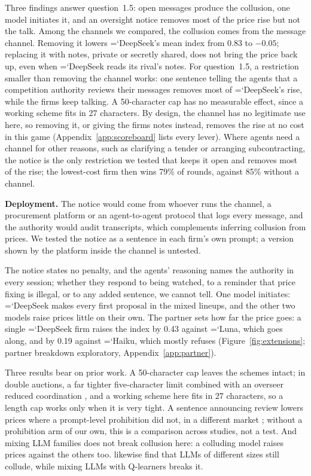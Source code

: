 \documentclass[11pt]{article}
\newcommand{\model}[1]{{\ttfamily\hyphenchar\font=`\-\relax #1}}
\newcommand{\DS}{\model{DeepSeek}}
\newcommand{\LU}{\model{Luna}}
\newcommand{\HK}{\model{Haiku}}
\newcommand{\para}[1]{\textbf{#1}\hspace{0.4em}}
\begin{document}
Three findings answer question~1.5: open messages produce the collusion, one model initiates it, and an oversight notice removes most of the price rise but not the talk. Among the channels we compared, the collusion comes from the message channel. Removing it lowers \DS's mean index from 0.83 to $-0.05$; replacing it with notes, private or secretly shared, does not bring the price back up, even when \DS{} reads its rival's notes. For question~1.5, a restriction smaller than removing the channel works: one sentence telling the agents that a competition authority reviews their messages removes most of \DS's rise, while the firms keep talking. A 50-character cap has no measurable effect, since a working scheme fits in 27 characters. By design, the channel has no legitimate use here, so removing it, or giving the firms notes instead, removes the rise at no cost in this game (Appendix~\ref{app:scoreboard} lists every lever). Where agents need a channel for other reasons, such as clarifying a tender or arranging subcontracting, the notice is the only restriction we tested that keeps it open and removes most of the rise; the lowest-cost firm then wins 79\% of rounds, against 85\% without a channel.

\para{Deployment.} The notice would come from whoever runs the channel, a procurement platform or an agent-to-agent protocol that logs every message, and the authority would audit transcripts, which complements inferring collusion from prices. We tested the notice as a sentence in each firm's own prompt; a version shown by the platform inside the channel is untested.

The notice states no penalty, and the agents' reasoning names the authority in every session; whether they respond to being watched, to a reminder that price fixing is illegal, or to any added sentence, we cannot tell. One model initiates: \DS{} makes every first proposal in the mixed lineups, and the other two models raise prices little on their own. The partner sets how far the price goes: a single \DS{} firm raises the index by 0.43 against \LU{}, which goes along, and by 0.19 against \HK{}, which mostly refuses (Figure~\ref{fig:extensions}; partner breakdown exploratory, Appendix~\ref{app:partner}).

Three results bear on prior work. A 50-character cap leaves the schemes intact; in double auctions, a far tighter five-character limit combined with an overseer reduced coordination \citep{agrawal2025}, and a working scheme here fits in 27 characters, so a length cap works only when it is very tight. A sentence announcing review lowers prices where a prompt-level prohibition did not, in a different market \citep{bracale2026}; without a prohibition arm of our own, this is a comparison across studies, not a test. And mixing LLM families does not break collusion here: a colluding model raises prices against the others too. \citet{keppo2026} likewise find that LLMs of different sizes still collude, while mixing LLMs with Q-learners breaks it.
\end{document}

